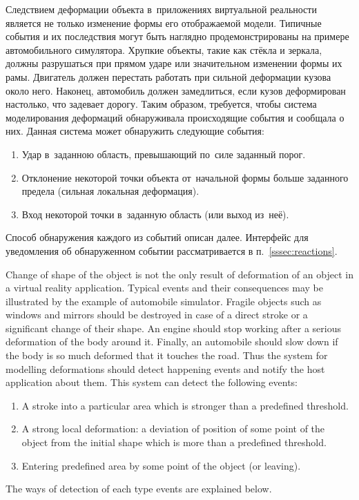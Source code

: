 \documentclass[a4paper, 12pt, titlepage]{extarticle}
\begin{document}
\begin{original}
        Следствием деформации объекта в~приложениях виртуальной реальности является не только
        изменение формы его отображаемой модели. Типичные события и их последствия могут быть
        наглядно продемонстрированы на примере автомобильного симулятора. Хрупкие объекты, такие как
        стёкла и зеркала, должны разрушаться при прямом ударе или значительном изменении формы их
        рамы. Двигатель должен перестать работать при сильной деформации кузова около него.
        Наконец, автомобиль должен замедлиться, если кузов деформирован настолько, что задевает
        дорогу. Таким образом, требуется, чтобы система моделирования деформаций обнаруживала
        происходящие события и сообщала о них. Данная система может обнаружить следующие события:
        \begin{enumerate}
          \item Удар в~заданною область, превышающий по~силе заданный порог.
          \item Отклонение некоторой точки объекта от~начальной формы больше заданного предела
          (сильная локальная деформация).
          \item Вход некоторой точки в~заданную область (или выход из~неё).
        \end{enumerate}
        Способ обнаружения каждого из событий описан далее. Интерфейс для уведомления об
        обнаруженном событии рассматривается в п.~\ref{sssec:reactions}.
\end{original}

        Change of shape of the object is not the only result of deformation of an object in a
        virtual reality application. Typical events and their consequences may be illustrated by the
        example of automobile simulator. Fragile objects such as windows and mirrors should be
        destroyed in case of a direct stroke or a significant change of their shape. An engine
        should stop working after a serious deformation of the body around it. Finally, an
        automobile should slow down if the body is so much deformed that it touches the road.
        Thus the system for modelling deformations should detect happening events and notify the
        host application about them. This system can detect the following events:
        \begin{enumerate}
          \item A stroke into a particular area which is stronger than a predefined threshold.
          \item A strong local deformation: a deviation of position of some point of the object from
                the initial shape which is more than a predefined threshold.
          \item Entering predefined area by some point of the object (or leaving).
        \end{enumerate}
        The ways of detection of each type events are explained below.
\end{document}
